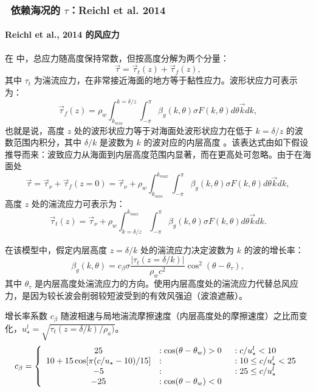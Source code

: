 \vsssub
\subsubsection{~依赖海况的 $\tau$：Reichl et al. 2014} \label{sec:FLD1}
\vsssub


\paragraph{Reichl et al., 2014 的风应力}

在 \citet{art:Rei14} 中，总应力随高度保持常数，但按高度分解为两个分量：
\begin{equation}
\vec{\tau}=\vec{\tau}_t(z)+\vec{\tau}_f(z),
\end{equation}
其中 $\tau_t$ 为湍流应力，在非常接近海面的地方等于黏性应力。波形状应力可表示为：
\begin{equation}
\vec{\tau}_f(z)=\rho_w\int^{k=\delta/z}_{k_{min}} \int^\pi_{-\pi}\beta_g(k,\theta) \sigma F(k,\theta) d\theta {\vec{k}} dk,
\end{equation}
也就是说，高度 $z$ 处的波形状应力等于对海面处波形状应力在低于 $k=\delta/z$ 的波数范围内积分，其中 $\delta/k$ 是波数为 $k$ 的波对应的内层高度 \citep{art:Har04}。该表达式由如下假设推导而来：波致应力从海面到内层高度范围内显著，而在更高处可忽略。由于在海面处
\begin{equation}
\vec{\tau}=\vec{\tau}_\nu+\vec{\tau}_f(z=0)=\vec{\tau}_\nu+\rho_w\int^{k_{max}}_{k_{min}} \int^\pi_{-\pi}\beta_g(k,\theta) \sigma F(k,\theta) d\theta {\vec{k}} dk,
\end{equation}
高度 $z$ 处的湍流应力可表示为：
\begin{equation}
\vec{\tau}_t(z)=\vec{\tau}_\nu+\rho_w\int^{k_{max}}_{k=\delta/z} \int^\pi_{-\pi}\beta_g(k,\theta) \sigma F(k,\theta) d\theta {\vec{k}} dk.
\end{equation}

在该模型中，假定内层高度 $z=\delta/k$ 处的湍流应力决定波数为 $k$ 的波的增长率：
\begin{equation}
\beta_g(k,\theta)=c_\beta \sigma\frac{\left|\tau_t(z=\delta/k)\right|}{\rho_wc^2}\cos^2(\theta-\theta_\tau),
\end{equation}
其中 $\theta_\tau$ 是内层高度处湍流应力的方向。使用内层高度处的湍流应力代替总风应力，是因为较长波会削弱较短波受到的有效风强迫（波浪遮蔽）。

增长率系数 $c_\beta$ 随波相速与局地湍流摩擦速度（内层高度处的摩擦速度）之比而变化，$u_\star^l=\sqrt{\tau_t(z=\delta/k)/\rho_a)}$。
\begin{equation}
c_{\beta}=\left\{
\begin{array}{cll} 
25  &: \cos(\theta-\theta_w)>0 \hspace{2mm}&:c/u_{\star}^l<10\\
10+15\cos[\pi(c/u_\star-10)/15]   &:&:10\le c/u_{\star}^l<25 \\
-5  &:&:25\le c/u_{\star}^l\\
-25  &: \cos(\theta-\theta_w)<0 &\\
\end{array}
\right.
\end{equation}

